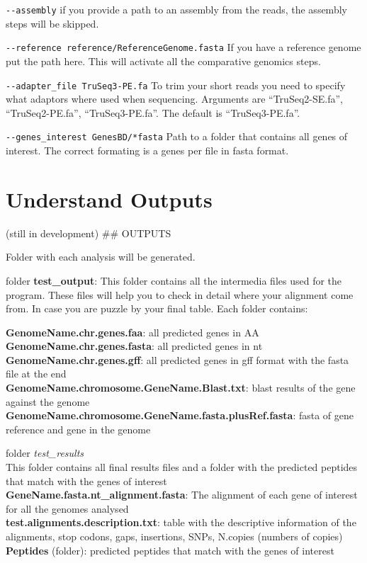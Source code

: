 \documentclass[
]{book}
\begin{document}
\texttt{-\/-assembly}
if you provide a path to an assembly from the reads, the assembly steps will be skipped.

\texttt{-\/-reference\ reference/ReferenceGenome.fasta}
If you have a reference genome put the path here. This will activate all the comparative genomics steps.

\texttt{-\/-adapter\_file\ TruSeq3-PE.fa}
To trim your short reads you need to specify what adaptors where used when sequencing. Arguments are ``TruSeq2-SE.fa'', ``TruSeq2-PE.fa'', ``TruSeq3-PE.fa''. The default is ``TruSeq3-PE.fa''.

\texttt{-\/-genes\_interest\ GenesBD/*fasta}
Path to a folder that contains all genes of interest. The correct formating is a genes per file in fasta format.

\hypertarget{understand-outputs}{%
\chapter{Understand Outputs}\label{understand-outputs}}

(still in development)
\#\# OUTPUTS

Folder with each analysis will be generated.

folder \textbf{test\_output}:
This folder contains all the intermedia files used for the program. These files will help you to check in detail where your alignment come from. In case you are puzzle by your final table. Each folder contains:

\textbf{GenomeName.chr.genes.faa}: all predicted genes in AA\\
\textbf{GenomeName.chr.genes.fasta}: all predicted genes in nt\\
\textbf{GenomeName.chr.genes.gff}: all predicted genes in gff format with the fasta file at the end\\
\textbf{GenomeName.chromosome.GeneName.Blast.txt}: blast results of the gene against the genome\\
\textbf{GenomeName.chromosome.GeneName.fasta.plusRef.fasta}: fasta of gene reference and gene in the genome

folder \emph{test\_results}\\
This folder contains all final results files and a folder with the predicted peptides that match with the genes of interest\\
\textbf{GeneName.fasta.nt\_alignment.fasta}: The alignment of each gene of interest for all the genomes analysed\\
\textbf{test.alignments.description.txt}: table with the descriptive information of the alignments, stop codons, gaps, insertions, SNPs, N.copies (numbers of copies)\\
\textbf{Peptides} (folder): predicted peptides that match with the genes of interest
\end{document}
